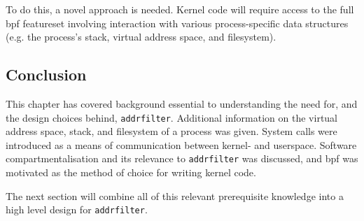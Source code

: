 To do this, a novel approach is needed. Kernel code will require access to the full
\ac{bpf} featureset involving interaction with various process-specific data
structures (e.g. the process's stack, virtual address space, and filesystem).

\subsection{Conclusion}

This chapter has covered background essential to understanding the need for, and
the design choices behind, \texttt{addrfilter}. Additional information on the
virtual address space, stack, and filesystem of a process was given. System
calls were introduced as a means of communication between kernel- and userspace.
Software compartmentalisation and its relevance to \texttt{addrfilter} was
discussed, and \ac{bpf} was motivated as the method of choice for writing kernel
code. 

The next section will combine all of this relevant prerequisite knowledge into a
high level design for \texttt{addrfilter}.

